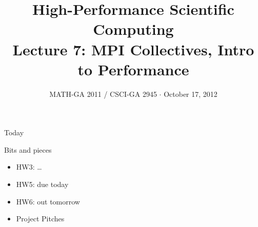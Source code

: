 \documentclass[english,compress]{beamer}
\begin{document}

\title{High-Performance Scientific Computing\\Lecture 7: MPI Collectives, Intro to Performance}

\date{MATH-GA 2011 / CSCI-GA 2945 $\cdot$ October 17, 2012}

\frame{\titlepage}

\begin{frame}{Today}
  \tableofcontents[hideallsubsections]
\end{frame}
\begin{frame}{Bits and pieces}
  \begin{itemize}
    \item HW3: \dots
    \item HW5: due today
    \item HW6: out tomorrow
    \item Project Pitches
  \end{itemize}
\end{frame}
\end{document}

